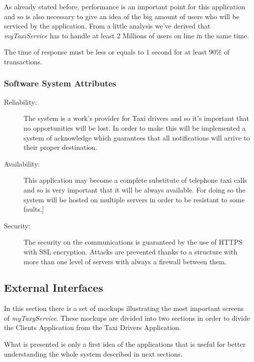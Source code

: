 \documentclass[a4paper]{article}
\begin{document}
\begin{enumerate}[label=\bfseries G\arabic*:]
As already stated before, performance is  an important point for this application and so is also necessary to give an idea of the big amount of users who will be serviced by the application.
From a little analysis we've derived that \emph{myTaxiService} has to handle at least 2 Millions of users on line in the same time.

The time of response must be less or equals to 1 second for at least 90\% of transactions.

\subsubsection{Software System Attributes}
\begin{description}
\item[Reliability:] The system is a work's provider for Taxi drivers and so it's important that no opportunities will be lost. \newline In order to make this will be implemented a system of acknowledge which guarantees that all notifications will arrive to their proper destination.

\item[Availability:] This application may become a complete substitute of telephone taxi calls and so is very important that it will be always available. For doing so the system will be hosted on multiple servers in order to be resistant to some faults.]
\item[Security:] The security on the communications is guaranteed by the use of HTTPS with SSL encryption. \newline Attacks are prevented thanks to a structure with more than one level of servers with always a firewall between them.
\end{description}

\subsection{External Interfaces}

In this section there is a set of mockups illustrating the most important screens of \emph{myTaxyService}. These mockups are divided into two sections in order to divide the Clients Application from the Taxi Drivers Application.

What is presented is only a first idea of the applications that is useful for better understanding the whole system described in next sections.

\newlength{\mockupWidth}
\setlength{\mockupWidth}{.38\textwidth}


\end{enumerate}
\end{document}
